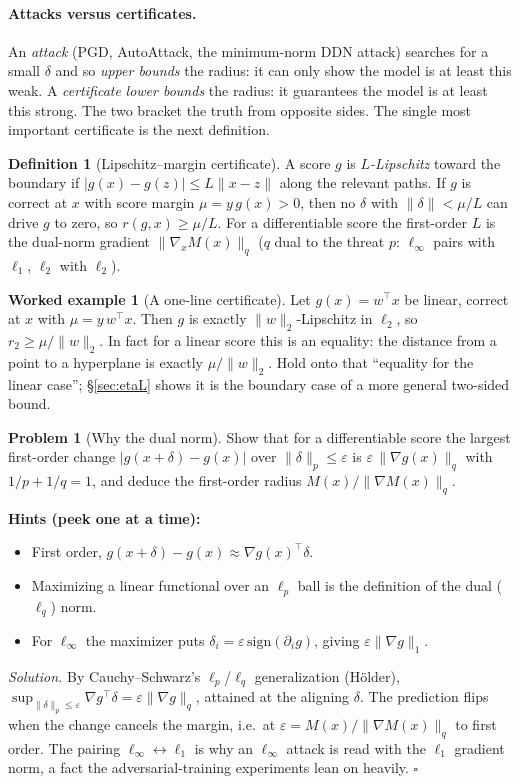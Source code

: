 \documentclass[11pt]{article}
\theoremstyle{plain}
\theoremstyle{definition}
\newtheorem{definition}[theorem]{Definition}
\newtheorem{example}[theorem]{Worked example}
\newtheorem{problem}{Problem}[section]
\theoremstyle{remark}
\newenvironment{hints}{\par\smallskip\noindent\textbf{\color{hintc}Hints (peek one at a time):}\begin{itemize}}{\end{itemize}\par\smallskip}
\newenvironment{solution}{\par\smallskip\noindent\textit{Solution.}\;}{\hfill$\square$\par\smallskip}
\newcommand{\sign}{\mathrm{sign}}
\begin{document}
\paragraph{Attacks versus certificates.} An \emph{attack} (PGD, AutoAttack, the minimum-norm DDN attack) searches
for a small $\delta$ and so \emph{upper bounds} the radius: it can only show the model is at least this weak. A
\emph{certificate} \emph{lower bounds} the radius: it guarantees the model is at least this strong. The two bracket
the truth from opposite sides. The single most important certificate is the next definition.

\begin{definition}[Lipschitz--margin certificate]\label{def:lipmargin}
A score $g$ is \emph{$L$-Lipschitz} toward the boundary if $|g(x)-g(z)|\le L\|x-z\|$ along the relevant paths. If
$g$ is correct at $x$ with score margin $\mu=y\,g(x)>0$, then no $\delta$ with $\|\delta\|<\mu/L$ can drive $g$ to
zero, so $r(g,x)\ge\mu/L$. For a differentiable score the first-order $L$ is the dual-norm gradient
$\|\nabla_x M(x)\|_q$ ($q$ dual to the threat $p$: $\ell_\infty$ pairs with $\ell_1$, $\ell_2$ with $\ell_2$).
\end{definition}

\begin{example}[A one-line certificate]
Let $g(x)=w^\top x$ be linear, correct at $x$ with $\mu=y\,w^\top x$. Then $g$ is exactly $\|w\|_2$-Lipschitz in
$\ell_2$, so $r_2\ge\mu/\|w\|_2$. In fact for a linear score this is an equality: the distance from a point to a
hyperplane is exactly $\mu/\|w\|_2$. Hold onto that ``equality for the linear case''; \S\ref{sec:etaL} shows it is
the boundary case of a more general two-sided bound.
\end{example}

\begin{problem}[Why the dual norm]\label{pr:dual}
Show that for a differentiable score the largest first-order change $|g(x+\delta)-g(x)|$ over $\|\delta\|_p\le\varepsilon$
is $\varepsilon\,\|\nabla g(x)\|_q$ with $1/p+1/q=1$, and deduce the first-order radius $M(x)/\|\nabla M(x)\|_q$.
\end{problem}
\begin{hints}
\item First order, $g(x+\delta)-g(x)\approx \nabla g(x)^\top\delta$.
\item Maximizing a linear functional over an $\ell_p$ ball is the definition of the dual ($\ell_q$) norm.
\item For $\ell_\infty$ the maximizer puts $\delta_i=\varepsilon\,\sign(\partial_i g)$, giving $\varepsilon\|\nabla g\|_1$.
\end{hints}
\begin{solution}
By Cauchy--Schwarz's $\ell_p$/$\ell_q$ generalization (Hölder), $\sup_{\|\delta\|_p\le\varepsilon}\nabla g^\top\delta
=\varepsilon\|\nabla g\|_q$, attained at the aligning $\delta$. The prediction flips when the change cancels the
margin, i.e.\ at $\varepsilon=M(x)/\|\nabla M(x)\|_q$ to first order. The pairing $\ell_\infty\!\leftrightarrow\!\ell_1$
is why an $\ell_\infty$ attack is read with the $\ell_1$ gradient norm, a fact the adversarial-training experiments
lean on heavily.
\end{solution}
\end{document}
